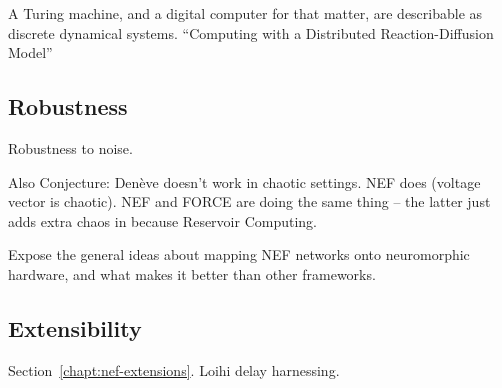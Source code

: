 A Turing machine, and a digital computer for that matter, are describable as discrete dynamical systems.
``Computing with a Distributed Reaction-Diffusion Model''


\subsection{Robustness}
\label{sec:nef-robustness}

Robustness to noise.

Also Conjecture: Den\`eve doesn't work in chaotic settings. NEF does (voltage vector is chaotic). NEF and FORCE are doing the same thing -- the latter just adds extra chaos in because Reservoir Computing.



Expose the general ideas about mapping NEF networks onto neuromorphic hardware, and what makes it better than other frameworks.


\subsection{Extensibility}
\label{sec:nef-extensibility}

Section~\ref{chapt:nef-extensions}. Loihi delay harnessing.
